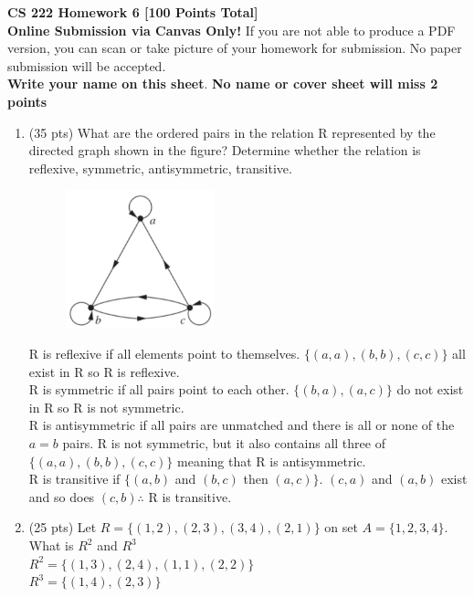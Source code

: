 \documentclass[11pt]{article}
\newcommand\tab[1][1cm]{\hspace*{#1}}
\begin{document}
{\Large {\bf CS 222 Homework 6 [100 Points Total]}}  \\

\noindent \textbf{Online Submission via Canvas Only!} If you are not able to produce a PDF version, you can scan or take picture of your homework for submission. No paper submission will be accepted.\\

\noindent \textbf{Write your name on this sheet}. \textbf{No name or cover sheet will miss 2 points}




\begin{enumerate}
  \item (35 pts) What are the ordered pairs in the relation R represented by the directed graph shown in the figure? Determine whether the relation is reflexive, symmetric, antisymmetric, transitive.
  \begin{figure}[!ht]
  \begin{center}
  \includegraphics[height=4cm]{6-1.PNG}\\
  \end{center}
  \end{figure}
  
  
  R is reflexive if all elements point to themselves. $\{(a,a), (b,b), (c,c)\}$ all exist in R so R is reflexive. \\
  R is symmetric if all pairs point to each other. $\{(b,a), (a,c)\}$ do not exist in R so R is not symmetric. \\
  R is antisymmetric if all pairs are unmatched and there is all or none of the $a=b$ pairs. R is not symmetric, but it also contains all three of $\{(a,a), (b,b), (c,c)\}$ meaning that R is antisymmetric. \\
  R is transitive if $\{(a,b)$ and $(b,c)$ then $(a,c)\}$. $(c,a)$ and $(a,b)$ exist and so does $(c,b)\therefore$ R is transitive. \\


    \item (25 pts) Let $R=\{(1,2),(2,3),(3,4),(2,1)\}$ on set $A=\{1,2,3,4\}$. What is $R^2$ and $R^3$\\
    	\tab $R^2 = \{(1,3), (2,4), (1,1), (2,2)\} $\\
	\tab $R^3 = \{(1,4), (2,3)\} $ \\\\


\end{enumerate}
\end{document}
